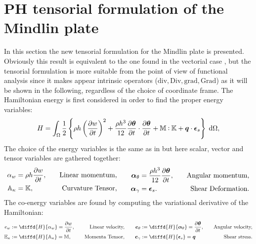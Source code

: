 \documentclass[preprint,12pt]{elsarticle}
\def\onedot{$\mathsurround0pt\ldotp$}
\def\cddot{%
	\mathbin{\vcenter{\baselineskip.67ex
			\hbox{\onedot}\hbox{\onedot}}%
}}
\begin{document}
\section{PH tensorial formulation of the Mindlin plate}
\label{sec:PH_ten_Min}
In this section the new tensorial formulation for the Mindlin plate is presented. {Obviously this result is equivalent to the one found in the vectorial case \cite{MacchelliMindlin}, but the tensorial formulation is more suitable from the point of view of functional analysis since it makes appear intrinsic operators ($\mathrm{div}, \mathrm{Div}, \mathrm{grad}, \mathrm{Grad}$) as it will be shown in the following, regardless of the choice of coordinate frame. \newline
The Hamiltonian energy is first considered in order to find the proper energy variables:
\begin{equation}
\label{eq:H_min}
H = \int_{\Omega} \frac{1}{2} \left\{ \rho h \left(\diffp{w}{t} \right)^2 + \frac{\rho h^3}{12} \diffp{\bm{\theta}}{t} \cdot   \diffp{\bm{\theta}}{t} +   \mathbb{M} \cddot \mathbb{K} + \bm{q} \cdot \bm{\epsilon}_s  \right\}  \d\Omega, 
\end{equation}
The choice of the energy variables is the same as in \cite{MacchelliMindlin} but here scalar,}  vector and tensor variables are gathered together:
\begin{equation}
\begin{aligned}
\alpha_w &= \rho h \diffp{w}{t}, \quad &\text{Linear momentum,} \\
\mathbb{A}_{\kappa} &= \mathbb{K}, \quad &\text{Curvature Tensor,} \\
\end{aligned} \qquad
\begin{aligned}
\bm\alpha_{\theta} &=  \frac{\rho h^3}{12} \diffp{\bm{\theta}}{t}, \quad &\text{Angular momentum,}\\
\bm\alpha_{\gamma} &= \bm{\epsilon}_s. \quad &\text{Shear Deformation.}\\
\end{aligned}
\end{equation}
The co-energy variables are found by computing the variational derivative of the Hamiltonian:
\begin{equation}
\begin{aligned}
e_w &:= \diffd{H}{\alpha_w} = \diffp{w}{t},  \quad &\text{Linear velocity,} \\
\mathbb{E}_{\kappa} &:= \diffd{H}{\mathbb{A}_{\kappa}} = \mathbb{M}, \quad &\text{Momenta Tensor,}\\
\end{aligned} \qquad
\begin{aligned}
\bm{e}_{\theta} &:= \diffd{H}{\bm\alpha_{\theta}} = \diffp{\bm{\theta}}{t}, \quad &\text{Angular velocity,}  \\
\bm{e}_{\gamma} &:= \diffd{H}{\bm{\epsilon}_s} = \bm{q} \quad &\text{Shear stress.} \\
\end{aligned}
\end{equation}
\end{document}
